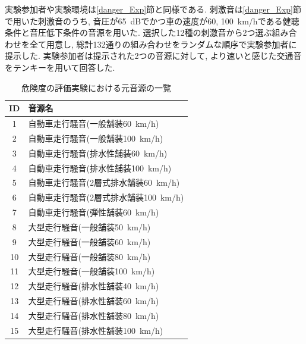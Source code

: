\documentclass[10pt,twocolumn,uplatex,dvipdfmx]{jsarticle} %
\begin{document}
実験参加者や実験環境は\ref{danger_Exp}節と同様である. 刺激音は\ref{danger_Exp}節で用いた刺激音のうち, 音圧が65~dBでかつ車の速度が60, 100~km/hである健聴条件と音圧低下条件の音源を用いた. 選択した12種の刺激音から2つ選ぶ組み合わせを全て用意し, 総計132通りの組み合わせをランダムな順序で実験参加者に提示した. 実験参加者は提示された2つの音源に対して, より速いと感じた交通音をテンキーを用いて回答した.

\begin{table}[H]
    \begin{center}
        \caption{危険度の評価実験における元音源の一覧}
        \begin{tabular}{cl} \hline
            ID & 音源名                                       \\ \hline \hline
            1 & 自動車走行騒音(一般舗装60~km/h)                 \\ \hline
            2 & 自動車走行騒音(一般舗装100~km/h)                \\ \hline
            3 & 自動車走行騒音(排水性舗装60~km/h)                 \\ \hline
            4 & 自動車走行騒音(排水性舗装100~km/h)             \\ \hline
            5 & 自動車走行騒音(2層式排水舗装60~km/h)             \\ \hline
            6 & 自動車走行騒音(2層式排水舗装100~km/h)           \\ \hline
            7 & 自動車走行騒音(弾性舗装60~km/h)                   \\ \hline
            8 & 大型走行騒音(一般舗装50~km/h)                   \\ \hline
            9 & 大型走行騒音(一般舗装60~km/h)                   \\ \hline
            10 & 大型走行騒音(一般舗装80~km/h)                    \\ \hline
            11 & 大型走行騒音(一般舗装100~km/h)                    \\ \hline
            12 & 大型走行騒音(排水性舗装40~km/h)                  \\ \hline
            13 & 大型走行騒音(排水性舗装60~km/h)                  \\ \hline
            14 & 大型走行騒音(排水性舗装80~km/h)                 \\ \hline
            15 & 大型走行騒音(排水性舗装100~km/h)                \\ \hline

        \end{tabular}
        \label{tab:CarSndStimList}
    \end{center}
\end{table}
\end{document}
